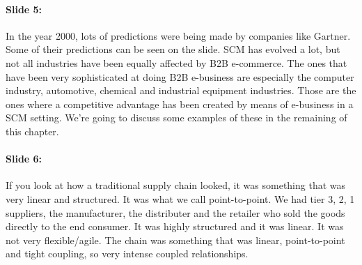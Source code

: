 \documentclass[10pt,a4paper]{report}
\begin{document}
\paragraph{Slide 5:}In the year 2000, lots of predictions were being made by companies like Gartner. Some of their predictions can be seen on the slide. SCM has evolved a lot, but not all industries have been equally affected by B2B e-commerce. The ones that have been very sophisticated at doing B2B e-business are especially the computer industry, automotive, chemical and industrial equipment industries. Those are the ones where a competitive advantage has been created by means of e-business in a SCM setting. We're going to discuss some examples of these in the remaining of this chapter.

\paragraph{Slide 6:}If you look at how a traditional supply chain looked, it was something that was very linear and structured. It was what we call point-to-point. We had tier 3, 2, 1 suppliers, the manufacturer, the distributer and the retailer who sold the goods directly to the end consumer. It was highly structured and it was linear. It was not very flexible/agile. The chain was something that was linear, point-to-point and tight coupling, so very intense coupled relationships.
\end{document}
